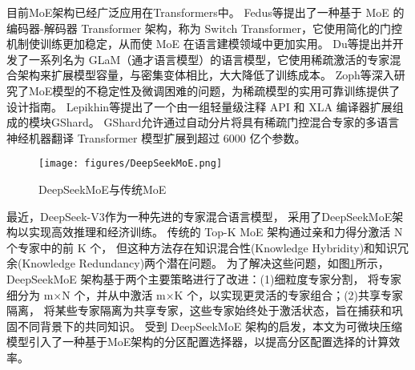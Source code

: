 目前MoE架构已经广泛应用在Transformers\cite{vaswani2017attention}中。
Fedus等\cite{fedus2022switch}提出了一种基于 MoE 的编码器-解码器 Transformer 架构，称为 Switch Transformer，它使用简化的门控机制使训练更加稳定，从而使 MoE 在语言建模领域中更加实用。
Du等\cite{du2022glam}提出并开发了一系列名为 GLaM（通才语言模型）的语言模型，它使用稀疏激活的专家混合架构来扩展模型容量，与密集变体相比，大大降低了训练成本。
Zoph等\cite{zoph2022st}深入研究了MoE模型的不稳定性及微调困难的问题，为稀疏模型的实用可靠训练提供了设计指南。
Lepikhin等\cite{lepikhin2020gshard}提出了一个由一组轻量级注释 API 和 XLA 编译器扩展组成的模块GShard。 GShard允许通过自动分片将具有稀疏门控混合专家的多语言神经机器翻译 Transformer 模型扩展到超过 6000 亿个参数。



\begin{figure}[htbp]
    \centering
    \texttt{[image: figures/DeepSeekMoE.png]}
    \caption{DeepSeekMoE与传统MoE\cite{dai2024deepseekmoe}}
    \label{fig:DeepSeekMoE}
\end{figure}

最近，DeepSeek-V3\cite{liu2024deepseek}作为一种先进的专家混合语言模型，
采用了DeepSeekMoE架构\cite{dai2024deepseekmoe}以实现高效推理和经济训练。
传统的 Top-K MoE 架构通过亲和力得分激活 N 个专家中的前 K 个，
但这种方法存在知识混合性(Knowledge Hybridity)和知识冗余(Knowledge Redundancy)两个潜在问题。
为了解决这些问题，如图\ref{fig:DeepSeekMoE}所示，DeepSeekMoE 架构基于两个主要策略进行了改进：(1)细粒度专家分割，
将专家细分为 m×N 个，并从中激活 m×K 个，以实现更灵活的专家组合；(2)共享专家隔离，
将某些专家隔离为共享专家，这些专家始终处于激活状态，旨在捕获和巩固不同背景下的共同知识。
受到 DeepSeekMoE 架构的启发，本文为可微块压缩模型引入了一种基于MoE架构的分区配置选择器，以提高分区配置选择的计算效率。


